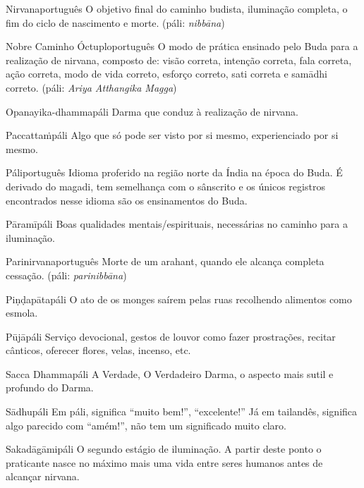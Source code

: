 \begin{glossarydescription}
  \item[{{Nirvana}{português}}] O objetivo final do caminho budista, iluminação completa, o fim do ciclo de nascimento e morte. (páli: \emph{nibbāna})

  \item[{{Nobre Caminho Óctuplo}{português}}] O modo de prática ensinado pelo Buda para a realização de nirvana, composto de: visão correta, intenção correta, fala correta, ação correta, modo de vida correto, esforço correto, sati correta e samādhi correto. (páli: \emph{Ariya Atthangika Magga})

  \item[{{Opanayika-dhamma}{páli}}] Darma que conduz à realização de nirvana.

  \item[{{Paccattaṁ}{páli}}] Algo que só pode ser visto por si mesmo, experienciado por si mesmo.

  \item[{{Páli}{português}}] Idioma proferido na região norte da Índia na época do Buda. É derivado do magadi, tem semelhança com o sânscrito e os únicos registros encontrados nesse idioma são os ensinamentos do Buda.

  \item[{{Pāramī}{páli}}] Boas qualidades mentais/espirituais, necessárias no caminho para a iluminação.

  \item[{{Parinirvana}{português}}] Morte de um arahant, quando ele alcança completa cessação. (páli: \emph{parinibbāna})

  \item[{{Piṇḍapāta}{páli}}] O ato de os monges saírem pelas ruas recolhendo alimentos como esmola.

  \item[{{Pūjā}{páli}}] Serviço devocional, gestos de louvor como fazer prostrações, recitar cânticos, oferecer flores, velas, incenso, etc.

  \item[{{Sacca Dhamma}{páli}}] A Verdade, O Verdadeiro Darma, o aspecto mais sutil e profundo do Darma.

  \item[{{Sādhu}{páli}}] Em páli, significa “muito bem!”, “excelente!” Já em tailandês, significa algo parecido com “amém!”, não tem um significado muito claro.

  \item[{{Sakadāgāmi}{páli}}] O segundo estágio de iluminação. A partir deste ponto o praticante nasce no máximo mais uma vida entre seres humanos antes de alcançar nirvana.


\end{glossarydescription}
